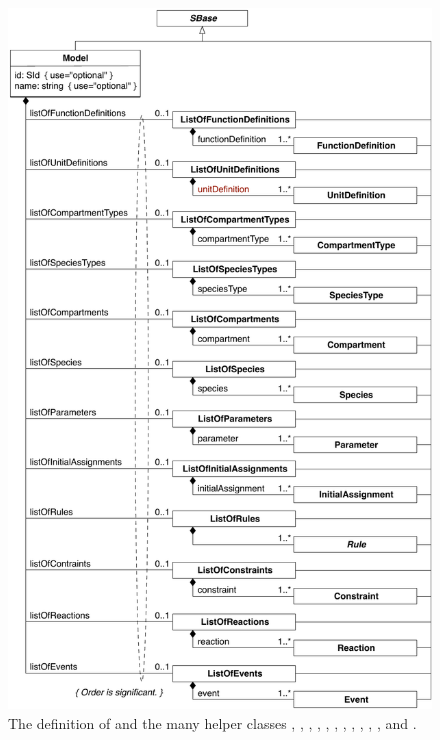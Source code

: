 \begin{figure}[htb]
  \centering
  \vspace*{-2ex}
  \includegraphics[scale=0.76]{figs/model-uml}
  \vspace*{-1.1ex}
  \caption{The definition of \Model and the many helper
      classes \ListOfFunctionDefinitions, \ListOfUnitDefinitions,
      \ListOfCompartmentTypes, \ListOfSpeciesTypes,
      \ListOfCompartments, \ListOfSpecies, \ListOfParameters,
      \ListOfInitialAssignments, \ListOfRules, \ListOfConstraints,
      \ListOfReactions, and \ListOfEvents.}
  \label{fig:model}
\end{figure}

